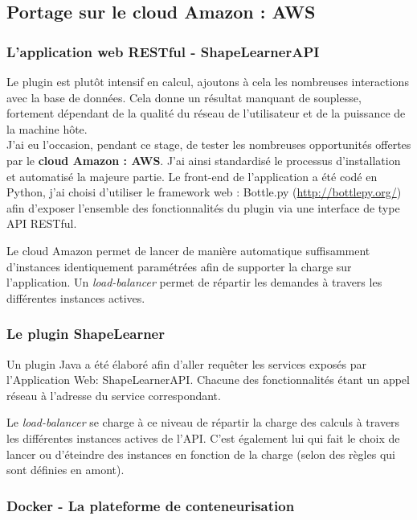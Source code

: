 \subsection{Portage sur le cloud Amazon : AWS}

\subsubsection{L'application web RESTful - ShapeLearnerAPI}

Le plugin est plutôt intensif en calcul, ajoutons à cela les nombreuses interactions avec la base de données. Cela donne un résultat manquant de souplesse, fortement dépendant de la qualité du réseau de l'utilisateur et de la puissance de la machine hôte.\\
J'ai eu l'occasion, pendant ce stage, de tester les nombreuses opportunités offertes par le \textbf{cloud Amazon : AWS}.
J'ai ainsi standardisé le processus d'installation et automatisé la majeure partie. Le front-end de l'application a été codé en Python, j'ai choisi d'utiliser le framework web : Bottle.py (\url{http://bottlepy.org/}) afin d'exposer l'ensemble des fonctionnalités du plugin via une interface de type API RESTful.

Le cloud Amazon permet de lancer de manière automatique suffisamment d'instances identiquement paramétrées afin de supporter la charge sur l'application. Un \textit{load-balancer} permet de répartir les demandes à travers les différentes instances actives.

\subsubsection{Le plugin ShapeLearner}

Un plugin Java a été élaboré afin d'aller requêter les services exposés par l'Application Web: ShapeLearnerAPI\-. Chacune des fonctionnalités étant un appel réseau à l'adresse du service correspondant. 

Le \textit{load-balancer} se charge à ce niveau de répartir la charge des calculs à travers les différentes instances actives de l'API. C'est également lui qui fait le choix de lancer ou d'éteindre des instances en fonction de la charge (selon des règles qui sont définies en amont).

\clearpage

\subsubsection{Docker - La plateforme de conteneurisation}

